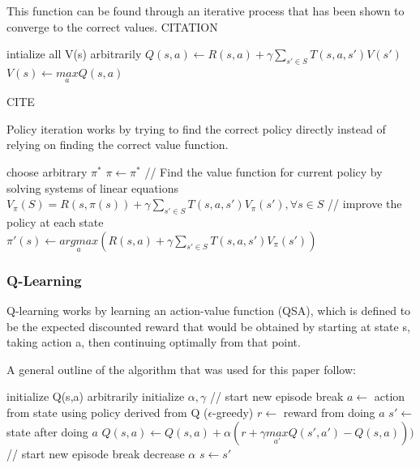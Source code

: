 \documentclass[a4paper,10pt]{article}
\begin{document}
This function can be found through an iterative process that has been shown to converge to the correct values. CITATION

\begin{algorithmic}[H]
  \STATE intialize all V(s) arbitrarily
  \REPEAT
			\STATE $Q(s,a) \leftarrow R(s,a) + \gamma \sum\limits_{s'  \in S} T(s, a, s') V(s')$
		\ENDFOR
		\STATE $V(s) \leftarrow \underset{a}{max}Q(s,a)$
	\ENDFOR
\end{algorithmic}
CITE

Policy iteration works by trying to find the correct policy directly instead of relying on finding the correct value function. 

\begin{algorithmic}[H]
\STATE choose arbitrary $\pi^*$
\REPEAT
	\STATE $\pi \leftarrow \pi^* $
	\STATE  // Find the value function for current policy by solving systems of linear equations
	\STATE $V_\pi(S) = R(s, \pi(s)) + \gamma \sum\limits_{s' \in S} T(s, a, s') V_\pi(s'), \forall s \in S$
	\STATE // improve the policy at each state
	\STATE $\pi'(s) \leftarrow \underset{a}{argmax}(R(s,a) + \gamma \sum\limits_{s' \in S} T(s, a, s') V_\pi(s'))$

\end{algorithmic}

\subsubsection{Q-Learning}
Q-learning works by learning an action-value function (QSA), which is defined to be the expected discounted reward that would be obtained by starting at state s, taking action a, then continuing optimally from that point.

A general outline of the algorithm that was used for this paper follow:
\begin{algorithmic}[H]
\STATE initialize Q(s,a) arbitrarily
\STATE initialize $\alpha, \gamma$
	\STATE // start new episode
	\STATE break
	\ENDIF
	\STATE $a \leftarrow $ action from state using policy derived from Q ($\epsilon$-greedy)
	\STATE $r \leftarrow $ reward from doing $a$
	\STATE $s' \leftarrow $ state after doing $a$
	\STATE $Q(s,a) \leftarrow Q(s,a) + \alpha(r + \gamma \underset{a'}{max}Q(s',a') - Q(s,a)))$
		\STATE // start new episode
		\STATE break
	\ENDIF
	\STATE decrease $\alpha$
	\STATE $ s \leftarrow s'$
	\ENDFOR
\ENDFOR
\end{algorithmic}
\end{document}
